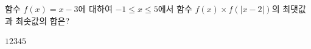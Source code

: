 함수 $f(x)=x-3$에 대하여 $-1\le x\le 5$에서 함수 $f(x)\times f(|x-2|)$의 최댓값과 최솟값의 합은?
\begin{choices32}{$1$}{$2$}{$3$}{$4$}{$5$}\end{choices32}
